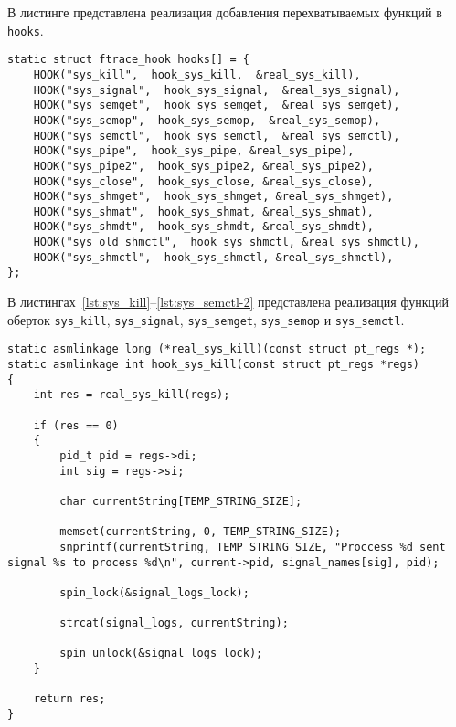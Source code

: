 В листинге представлена реализация добавления перехватываемых функций в \texttt{hooks}.
\begin{lstlisting}[label=lst:ftrace:hooks,caption=Реализация добавления перехватываемых функций в \texttt{hooks}]	
static struct ftrace_hook hooks[] = {
	HOOK("sys_kill",  hook_sys_kill,  &real_sys_kill),
	HOOK("sys_signal",  hook_sys_signal,  &real_sys_signal),
	HOOK("sys_semget",  hook_sys_semget,  &real_sys_semget),
	HOOK("sys_semop",  hook_sys_semop,  &real_sys_semop),
	HOOK("sys_semctl",  hook_sys_semctl,  &real_sys_semctl),
	HOOK("sys_pipe",  hook_sys_pipe, &real_sys_pipe),
	HOOK("sys_pipe2",  hook_sys_pipe2, &real_sys_pipe2),
	HOOK("sys_close",  hook_sys_close, &real_sys_close),
	HOOK("sys_shmget",  hook_sys_shmget, &real_sys_shmget),
	HOOK("sys_shmat",  hook_sys_shmat, &real_sys_shmat),
	HOOK("sys_shmdt",  hook_sys_shmdt, &real_sys_shmdt),
	HOOK("sys_old_shmctl",  hook_sys_shmctl, &real_sys_shmctl),
	HOOK("sys_shmctl",  hook_sys_shmctl, &real_sys_shmctl),
};
\end{lstlisting}

В листингах~\ref{lst:sys_kill}--\ref{lst:sys_semctl-2} представлена реализация функций оберток \newline \texttt{sys\_kill}, \texttt{sys\_signal}, \texttt{sys\_semget}, \texttt{sys\_semop} и \texttt{sys\_semctl}.

\clearpage

\begin{lstlisting}[label=lst:sys_kill,caption=Реализация функции обертки \texttt{sys\_kill()}]	
static asmlinkage long (*real_sys_kill)(const struct pt_regs *);
static asmlinkage int hook_sys_kill(const struct pt_regs *regs)
{
	int res = real_sys_kill(regs);
	
	if (res == 0)
	{
		pid_t pid = regs->di;
		int sig = regs->si;
		
		char currentString[TEMP_STRING_SIZE];
		
		memset(currentString, 0, TEMP_STRING_SIZE);	
		snprintf(currentString, TEMP_STRING_SIZE, "Proccess %d sent signal %s to process %d\n", current->pid, signal_names[sig], pid);
		
		spin_lock(&signal_logs_lock);
		
		strcat(signal_logs, currentString); 
		
		spin_unlock(&signal_logs_lock);
	}
	
	return res;
}
\end{lstlisting}

\clearpage

